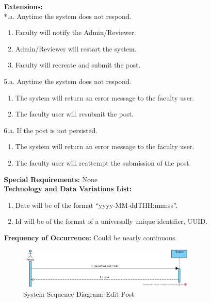\documentclass{article}
\begin{document}
\textbf{Extensions:} \\\relax
*.a. Anytime the system does not respond.
\begin{enumerate}
    \item Faculty will notify the Admin/Reviewer.
    \item Admin/Reviewer will restart the system.
    \item Faculty will recreate and submit the post.
\end{enumerate}
5.a. Anytime the system does not respond.
\begin{enumerate}
    \item The system will return an error message to the faculty user.
    \item The faculty user will resubmit the post.
\end{enumerate}
6.a. If the post is not persisted.
\begin{enumerate}
    \item The system will return an error message to the faculty user.
    \item The faculty user will reattempt the submission of the post.
\end{enumerate}
\textbf{Special Requirements:} None \\
\textbf{Technology and Data Variations List: }
\begin{enumerate}
    \item Date will be of the format “yyyy-MM-ddTHH:mm:ss”.
    \item Id will be of the format of a universally unique identifier, UUID.
\end{enumerate}
\textbf{Frequency of Occurrence:} Could be nearly continuous. \\

\begin{figure}[H]
    \centering
    \includegraphics[width=0.8\textwidth]{images/SSD-UC10-CreatePost.png}
    \centering
    \caption{System Sequence Diagram: Edit Post}
\end{figure}

\end{document}
